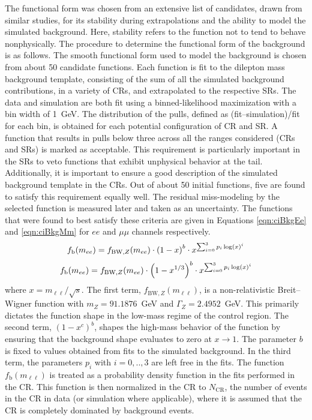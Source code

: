 The functional form was chosen from an extensive list of candidates, drawn from similar studies, for its stability during extrapolations and the ability to model the simulated background. Here, stability refers to the function not to tend to behave nonphysically.
The procedure to determine the functional form of the background is as follows.
The smooth functional form used to model the background is chosen from about 50 candidate functions.
Each function is fit to the dilepton mass background template, consisting of the sum of all the simulated background contributions, in a variety of CRs, and extrapolated to the respective SRs.
The data and simulation are both fit using a binned-likelihood maximization with a bin width of 1~GeV.
The distribution of the pulls, defined as (fit--simulation)/fit for each bin, is obtained for each potential configuration of CR and SR.
A function that results in pulls below three across all the ranges considered (CRs and SRs) is marked as acceptable.
This requirement is particularly important in the SRs to veto functions that exhibit unphysical behavior at the tail.
Additionally, it is important to ensure a good description of the simulated background template in the CRs.
Out of about 50 initial functions, five are found to satisfy this requirement equally well.
The residual miss-modeling by the selected function is measured later and taken as an uncertainty.
The functions that were found to best satisfy these criteria are given in Equations \ref{eqn:ciBkgEe} and \ref{eqn:ciBkgMm} for $ee$ and $\mu\mu$ channels respectively.
\begin{equation}\begin{split} \label{eqn:ciBkgEe}
f_\textrm{b}(m_{ee}) &= f_{\mathrm{BW},Z}(m_{ee}) \cdot \left(1 - x\right)^{b} \cdot x^{\sum_{i=0}^3 p_i\log(x)^i} \\
\end{split}\end{equation} 
\begin{equation}\begin{split}\label{eqn:ciBkgMm}
f_\textrm{b}(m_{ee}) &= f_{\mathrm{BW},Z}(m_{ee}) \cdot \left(1 - x^{1/3}\right)^{b} \cdot x^{\sum_{i=0}^3 p_i\log(x)^i} \\
\end{split}\end{equation} 
where $x = m_{\ell\ell}/\sqrt{s}$.
The first term, $f_{\mathrm{BW},Z}(m_{\ell\ell})$, is a non-relativistic Breit--Wigner function with $m_Z = 91.1876$~GeV and $\Gamma_Z = 2.4952$~GeV.
This primarily dictates the function shape in the low-mass regime of the control region.
The second term, $(1-x^{c})^{b}$, shapes the high-mass behavior of the function by ensuring that the background shape evaluates to zero at $x\to 1$.
The parameter $b$ is fixed to values obtained from fits to the simulated background.
In the third term, the parameters $p_i$ with $i=0,..,3$ are left free in the fits.
The function $f_\textrm{b}(m_{\ell\ell})$ is treated as a probability density function in the fits performed in the CR.
This function is then normalized in the CR to $N_\textrm{CR}$, the number of events in the CR in data (or simulation where applicable), where it is assumed that the CR is completely dominated by background events.

